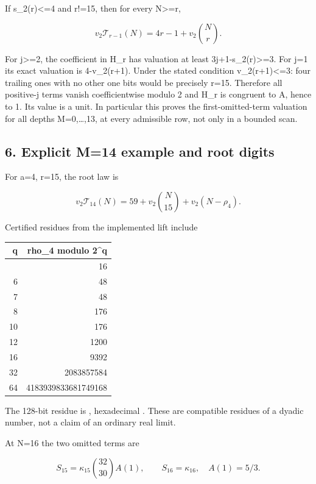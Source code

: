 \documentclass[11pt,letterpaper]{article}
\begin{document}
If s\_2(r)\textless=4 and r!=15, then for every N\textgreater=r,

\[
\boxed{v_2\mathcal T_{r-1}(N)=4r-1+v_2\binom Nr.}
\]

For j\textgreater=2, the coefficient in H\_r has valuation at least 3j+1-s\_2(r)\textgreater=3. For j=1 its exact valuation is 4-v\_2(r+1). Under the stated condition v\_2(r+1)\textless=3: four trailing ones with no other one bits would be precisely r=15. Therefore all positive-j terms vanish coefficientwise modulo 2 and H\_r is congruent to A, hence to 1. Its value is a unit. In particular this proves the first-omitted-term valuation for all depths M=0,\ldots,13, at every admissible row, not only in a bounded scan.

\subsection{6. Explicit M=14 example and root digits}\label{explicit-m14-example-and-root-digits}

For a=4, r=15, the root law is

\[
v_2\mathcal T_{14}(N)=59+v_2\binom N{15}+v_2(N-\rho_4).
\]

Certified residues from the implemented lift include

\begin{longtable}[]{@{}rr@{}}
\toprule\noalign{}
q & rho\_4 modulo 2\^{}q \\
\midrule\noalign{}
\endhead
\bottomrule\noalign{}
\endlastfoot
5 & 16 \\
6 & 48 \\
7 & 48 \\
8 & 176 \\
10 & 176 \\
12 & 1200 \\
16 & 9392 \\
32 & 2083857584 \\
64 & 4183939833681749168 \\
\end{longtable}

The 128-bit residue is , hexadecimal \texttt{}. These are compatible residues of a dyadic number, not a claim of an ordinary real limit.

At N=16 the two omitted terms are

\[
S_{15}=\kappa_{15}\binom{32}{30}A(1),\qquad S_{16}=\kappa_{16},
\quad A(1)=5/3.
\]
\end{document}
